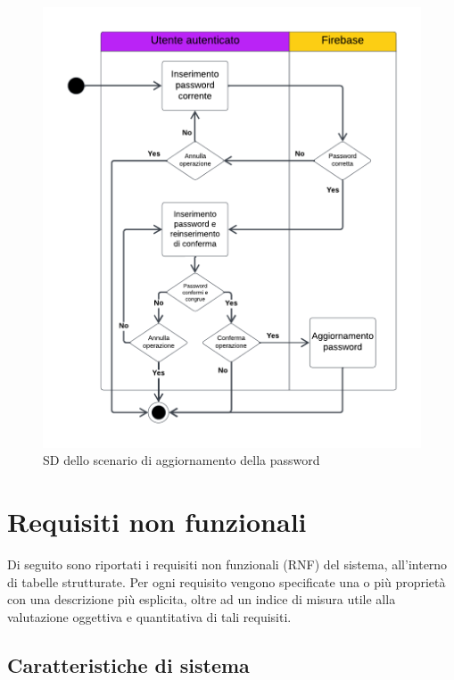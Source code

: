 \documentclass[11pt, a4paper]{article}
\theoremstyle{definition} %
\begin{document}
\begin{figure}[H]
\centering
\includegraphics[scale=0.85]{materiale/ucdiagrams/swimlanepassword.pdf}
\caption{SD dello scenario di aggiornamento della password}
\label{slpassword}
\end{figure}


\newpage
\section{Requisiti non funzionali}
Di seguito sono riportati i requisiti non funzionali (RNF)
del sistema, all'interno di tabelle strutturate. Per ogni requisito vengono
specificate una o più proprietà con una descrizione più esplicita,
oltre ad un indice di misura utile alla valutazione oggettiva
e quantitativa di tali requisiti.

\subsection{Caratteristiche di sistema}
\end{document}
